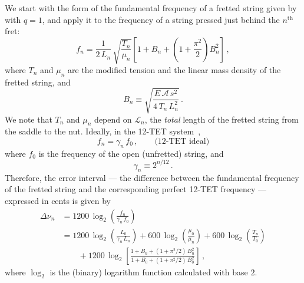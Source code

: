 We start with the form of the fundamental frequency of a fretted string given by  with $q = 1$, and apply it to the frequency of a string pressed just behind the $n^\mathrm{th}$ fret:
 \begin{equation} \label{eqn:f_n_def}
f_n = \frac{1}{2\, L_n}\, \sqrt{\frac{T_n}{\mu_n}} \left[ 1 + B_n + \left(1 + \frac{\pi^2}{2}\right) B_n^2 \right]\, ,
 \end{equation}
where $T_n$ and $\mu_n$ are the modified tension and the linear mass density of the fretted string, and
 \begin{equation} \label{eqn:b_n_def}
B_n \equiv \sqrt{\frac{E\, \mathcal{A}\, s^2}{4\, T_n\, L_n^2}}\, .
 \end{equation}
We note that $T_n$ and $\mu_n$ depend on $\mathcal{L}_n$, the \emph{total} length of the fretted string from the saddle to the nut. Ideally, in the 12-TET system~\cite{ref:durfee2015pms},
 \begin{equation} \label{eqn:f_n_tet}
f_n = \gamma_n\, f_0\, , \qquad \textrm{(12-TET~ideal)}
 \end{equation}
where $f_0$ is the frequency of the open (unfretted) string, and
 \begin{equation} \label{eqn:gamme_n_def}
\gamma_n \equiv 2^{n / 12}\, .
 \end{equation}
Therefore, the error interval --- the difference between the fundamental frequency of the fretted string and the corresponding perfect 12-TET frequency --- expressed in cents is given by
 \begin{equation}\label{eqn:error_def}
 \begin{split}
\Delta \nu_n &= 1200\, \log_2\left( \frac{f_n}{\gamma_n\, f_0} \right) \\
&= 1200\, \log_2 \left( \frac{L_0}{\gamma_n\, L_n} \right) + 600\, \log_2 \left(  \frac{\mu_0}{\mu_n} \right) + 600\, \log_2 \left( \frac{T_n}{T_0} \right) \\
&\qquad + 1200\, \log_2 \left[ \frac{1 + B_n + (1 + \pi^2/2)\, B_n^2}{1 + B_0 + (1 + \pi^2/2)\, B_0^2} \right]\, ,
 \end{split}
 \end{equation}
where $\log_2$ is the (binary) logarithm function calculated with base $2$.

